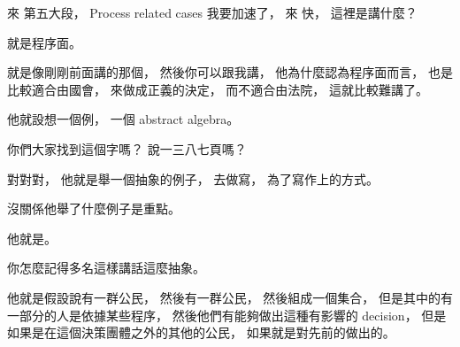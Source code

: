\hypertarget{w06:cue:2683}{}來 第五大段，
\hypertarget{w06:cue:2684}{}Process related cases
\hypertarget{w06:cue:2685}{}我要加速了，
\hypertarget{w06:cue:2686}{}來 快，
\hypertarget{w06:cue:2687}{}這裡是講什麼？

\hypertarget{w06:cue:2688}{}就是程序面。

\hypertarget{w06:cue:2689}{}就是像剛剛前面講的那個，
\hypertarget{w06:cue:2690}{}然後你可以跟我講，
\hypertarget{w06:cue:2691}{}他為什麼認為程序面而言，
\hypertarget{w06:cue:2692}{}也是比較適合由國會，
\hypertarget{w06:cue:2693}{}來做成正義的決定，
\hypertarget{w06:cue:2694}{}而不適合由法院，
\hypertarget{w06:cue:2695}{}這就比較難講了。

\hypertarget{w06:cue:2696}{}他就設想一個例，
\hypertarget{w06:cue:2697}{}一個 abstract algebra。

\hypertarget{w06:cue:2698}{}你們大家找到這個字嗎？
\hypertarget{w06:cue:2699}{}說一三八七頁嗎？

\hypertarget{w06:cue:2700}{}對對對，
\hypertarget{w06:cue:2701}{}他就是舉一個抽象的例子，
\hypertarget{w06:cue:2702}{}去做寫，
\hypertarget{w06:cue:2703}{}為了寫作上的方式。

\hypertarget{w06:cue:2704}{}沒關係他舉了什麼例子是重點。

\hypertarget{w06:cue:2705}{}他就是。

\hypertarget{w06:cue:2706}{}你怎麼記得多名這樣講話這麼抽象。

\hypertarget{w06:cue:2707}{}他就是假設說有一群公民，
\hypertarget{w06:cue:2708}{}然後有一群公民，
\hypertarget{w06:cue:2709}{}然後組成一個集合，
\hypertarget{w06:cue:2710}{}但是其中的有一部分的人是依據某些程序，
\hypertarget{w06:cue:2711}{}然後他們有能夠做出這種有影響的 decision，
\hypertarget{w06:cue:2712}{}但是如果是在這個決策團體之外的其他的公民，
\hypertarget{w06:cue:2713}{}如果就是對先前的做出的。

